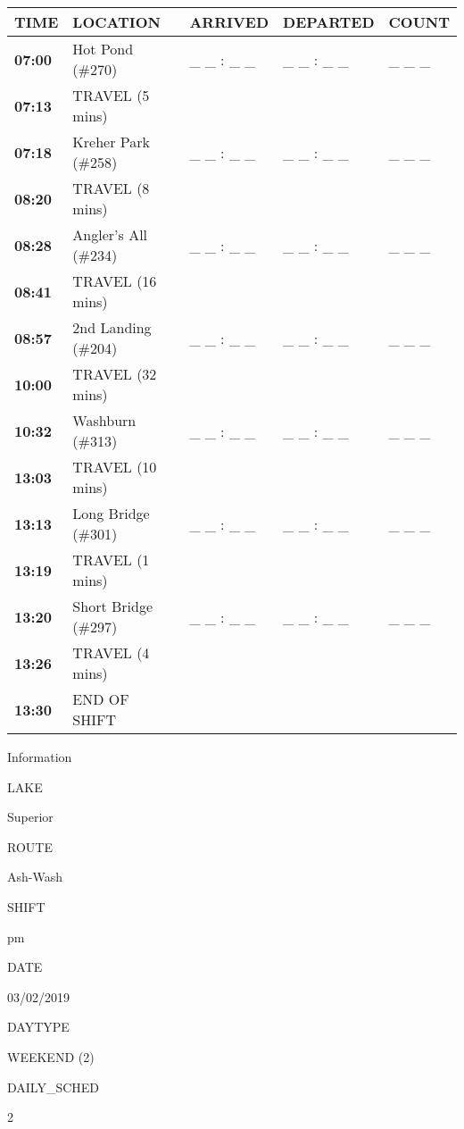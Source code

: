 \documentclass[]{article}
\begin{document}
\begin{tabular}{>{\bfseries}lllll}
\toprule
\textbf{TIME} & \textbf{LOCATION} & \textbf{ARRIVED} & \textbf{DEPARTED} & \textbf{COUNT}\\
\midrule
07:00 & Hot Pond (\#270) & \_ \_ : \_ \_ & \_ \_ : \_ \_ & \_ \_ \_\\
07:13 & TRAVEL (5 mins) &  &  & \\
07:18 & Kreher Park (\#258) & \_ \_ : \_ \_ & \_ \_ : \_ \_ & \_ \_ \_\\
08:20 & TRAVEL (8 mins) &  &  & \\
08:28 & Angler's All (\#234) & \_ \_ : \_ \_ & \_ \_ : \_ \_ & \_ \_ \_\\
08:41 & TRAVEL (16 mins) &  &  & \\
08:57 & 2nd Landing (\#204) & \_ \_ : \_ \_ & \_ \_ : \_ \_ & \_ \_ \_\\
10:00 & TRAVEL (32 mins) &  &  & \\
10:32 & Washburn (\#313) & \_ \_ : \_ \_ & \_ \_ : \_ \_ & \_ \_ \_\\
13:03 & TRAVEL (10 mins) &  &  & \\
13:13 & Long Bridge (\#301) & \_ \_ : \_ \_ & \_ \_ : \_ \_ & \_ \_ \_\\
13:19 & TRAVEL (1 mins) &  &  & \\
13:20 & Short Bridge (\#297) & \_ \_ : \_ \_ & \_ \_ : \_ \_ & \_ \_ \_\\
13:26 & TRAVEL (4 mins) &  &  & \\
13:30 & END OF SHIFT &  &  & \\
\bottomrule
\end{tabular}\newpage

Information

LAKE

Superior

ROUTE

Ash-Wash

SHIFT

pm

DATE

03/02/2019

DAYTYPE

WEEKEND (2)

DAILY\_SCHED

2

\vspace{24pt}
\end{document}
